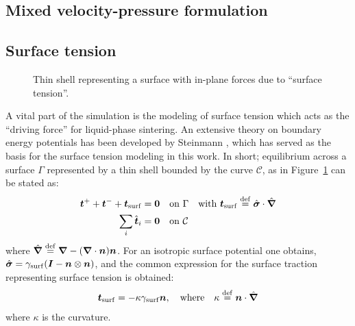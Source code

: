 \documentclass[ExampleMasters.tex]{subfiles}
\begin{document}
\subsection{Mixed velocity-pressure formulation}

\subsection{Surface tension}

\begin{figure}[th!]
    \centering
    
    \caption{Thin shell representing a surface with in-plane forces due to ``surface tension''.}
    \label{fig:surfacestress}
\end{figure}
A vital part of the simulation is the modeling of surface tension which acts as the ``driving force'' for liquid-phase sintering.
An extensive theory on boundary energy potentials has been developed by Steinmann \cite{Steinmann2008:boundaryenergies}, which has served as the basis for the surface tension modeling in this work.
In short; equilibrium across a surface $\Gamma$ represented by a thin shell bounded by the curve $\mathcal{C}$, as in Figure~\ref{fig:surfacestress} can be stated as:
\begin{align}
    \boldsymbol{t}^+ + \boldsymbol{t}^- + \boldsymbol{t}_{\mathrm{surf}} &= \boldsymbol{0} \quad \text{on} \,\, \Gamma \quad \text{with } \boldsymbol{t}_{\mathrm{surf}} \overset{\mathrm{def}}{=} \hat{\boldsymbol{\sigma}}\cdot\hat{\boldsymbol{\nabla}}
\label{eq103KR}\\
    \sum_i \hat{\boldsymbol{t}}_i &= \boldsymbol{0} \quad \text{on} \,\, \mathcal{C}
\label{eq104KR}
\end{align}
where $\hat{\boldsymbol{\nabla}} \overset{\mathrm{def}}{=} \boldsymbol{\nabla} - (\boldsymbol{\nabla}\cdot\boldsymbol{n})\boldsymbol{n}$.
For an isotropic surface potential one obtains, $\hat{\boldsymbol{\sigma}} = \gamma_{\mathrm{surf}}(\boldsymbol{I}-\boldsymbol{n}\mathbin{\otimes}\boldsymbol{n})$, and the common expression for the surface traction representing surface tension is obtained:
\begin{align}
 \boldsymbol{t}_{\mathrm{surf}} = -\kappa \gamma_{\mathrm{surf}} \boldsymbol{n},\quad \text{where}\quad \kappa \overset{\mathrm{def}}{=} \boldsymbol{n}\cdot\hat{\boldsymbol{\nabla}}
\end{align}
where $\kappa$ is the curvature.
\end{document}

